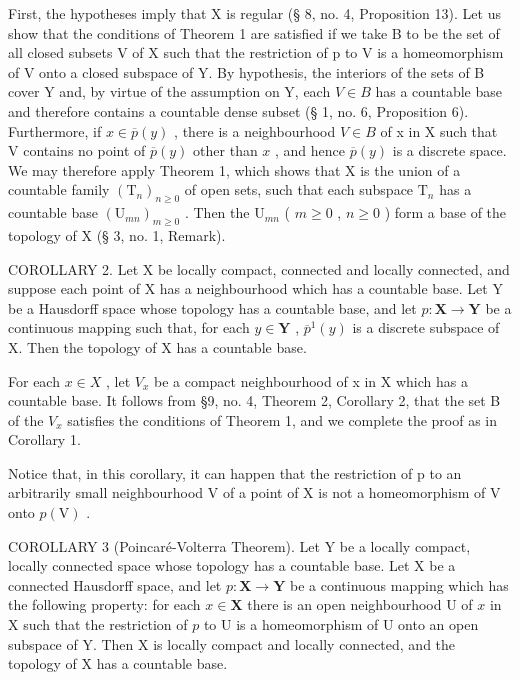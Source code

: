 First, the hypotheses imply that X is regular (§ 8, no. 4, Proposition 13). Let us show that the conditions of Theorem 1 are satisfied if we take B to be the set of all closed subsets V of X such that the restriction of p to V is a homeomorphism of V onto a closed subspace of Y. By hypothesis, the interiors of the sets of B cover Y and, by virtue of the assumption on Y, each \(V \in B\) has a countable base and therefore contains a countable dense subset (§ 1, no. 6, Proposition 6). Furthermore, if \(x \in \overline{p}(y)\) , there is a neighbourhood \(V \in B\) of x in X such that V contains no point of \(\overline{p}(y)\) other than \(x\) , and hence \(\overline{p}(y)\) is a discrete space. We may therefore apply Theorem 1, which shows that X is the union of a countable family \((\mathrm{T}_n)_{n\geqslant 0}\) of open sets, such that each subspace \(\mathrm{T}_n\) has a countable base \((\mathrm{U}_{mn})_{m\geqslant 0}\) . Then the \(\mathrm{U}_{mn}\) ( \(m\geqslant 0\) , \(n\geqslant 0\) ) form a base of the topology of X (§ 3, no. 1, Remark).

COROLLARY 2. Let X be locally compact, connected and locally connected, and suppose each point of X has a neighbourhood which has a countable base. Let Y be a Hausdorff space whose topology has a countable base, and let \(p: \mathbf{X} \to \mathbf{Y}\) be a continuous mapping such that, for each \(y \in \mathbf{Y}\) , \(\overline{p}^1(y)\) is a discrete subspace of X. Then the topology of X has a countable base.

For each \(x \in X\) , let \(V_{x}\) be a compact neighbourhood of x in X which has a countable base. It follows from §9, no. 4, Theorem 2, Corollary 2, that the set B of the \(V_{x}\) satisfies the conditions of Theorem 1, and we complete the proof as in Corollary 1.

Notice that, in this corollary, it can happen that the restriction of p to an arbitrarily small neighbourhood V of a point of X is not a homeomorphism of V onto \(p(\mathrm{V})\) .

COROLLARY 3 (Poincaré-Volterra Theorem). Let Y be a locally compact, locally connected space whose topology has a countable base. Let X be a connected Hausdorff space, and let \(p: \mathbf{X} \to \mathbf{Y}\) be a continuous mapping which has the following property: for each \(x \in \mathbf{X}\) there is an open neighbourhood U of \(x\) in X such that the restriction of \(p\) to U is a homeomorphism of U onto an open subspace of Y. Then X is locally compact and locally connected, and the topology of X has a countable base.

